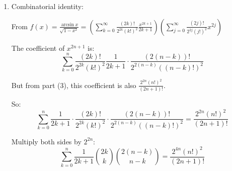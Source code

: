 \documentclass[12pt]{article}
\begin{document}
\begin{answerbox}
\begin{enumerate}
    Since $f(0) = 0$ (as $\arcsin 0 = 0$), we have $a_0 = 0$.
    
    Then from recurrence:
    \begin{align*}
    a_0 &= 0 \\
    a_1 &= 1 \\
    a_2 &= \frac{a_0}{2} = 0 \\
    a_3 &= \frac{2}{3} a_1 = \frac{2}{3} \\
    a_4 &= \frac{3}{4} a_2 = 0 \\
    a_5 &= \frac{4}{5} a_3 = \frac{4}{5} \cdot \frac{2}{3} = \frac{8}{15}
    \end{align*}
    
    So only odd coefficients are non-zero:
    \[
    a_{2n+1} = \frac{2n}{2n+1} a_{2n-1} = \frac{2n}{2n+1} \cdot \frac{2n-2}{2n-1} \cdots \frac{2}{3} \cdot 1
    \]
    \[
    = \frac{(2n)!!}{(2n+1)!!} = \frac{2^n n!}{(2n+1)!!}
    \]
    
    Alternatively: $a_{2n+1} = \frac{2^{2n}(n!)^2}{(2n+1)!}$
    
    So:
    \[
    f(x) = \sum_{n=0}^\infty \frac{2^{2n}(n!)^2}{(2n+1)!} x^{2n+1}
    \]
    
    \item Combinatorial identity:
    
    From $f(x) = \frac{\arcsin x}{\sqrt{1-x^2}} = \left(\sum_{k=0}^\infty \frac{(2k)!}{2^{2k}(k!)^2} \frac{x^{2k+1}}{2k+1}\right) \left(\sum_{j=0}^\infty \frac{(2j)!}{2^{2j}(j!)^2} x^{2j}\right)$
    
    The coefficient of $x^{2n+1}$ is:
    \[
    \sum_{k=0}^n \frac{(2k)!}{2^{2k}(k!)^2} \frac{1}{2k+1} \cdot \frac{(2(n-k))!}{2^{2(n-k)}((n-k)!)^2}
    \]
    
    But from part (3), this coefficient is also $\frac{2^{2n}(n!)^2}{(2n+1)!}$.
    
    So:
    \[
    \sum_{k=0}^n \frac{1}{2k+1} \cdot \frac{(2k)!}{2^{2k}(k!)^2} \cdot \frac{(2(n-k))!}{2^{2(n-k)}((n-k)!)^2} = \frac{2^{2n}(n!)^2}{(2n+1)!}
    \]
    
    Multiply both sides by $2^{2n}$:
    \[
    \sum_{k=0}^n \frac{1}{2k+1} \binom{2k}{k} \binom{2(n-k)}{n-k} = \frac{2^{4n}(n!)^2}{(2n+1)!}
    \]
\end{enumerate}
\end{answerbox}

\end{document}
